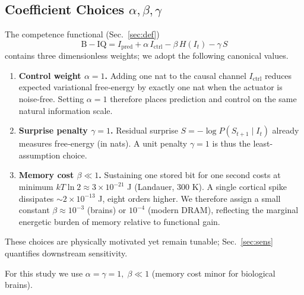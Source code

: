 \documentclass[10pt,conference]{IEEEtran}
\begin{document}
\subsection{Coefficient Choices \texorpdfstring{$\alpha,\beta,\gamma$}{(alpha,beta,gamma)}}
\label{sec:coeff}
The competence functional (Sec.~\ref{sec:def})
\[
\mathrm{B\!-\!IQ}
 = I_{\mathrm{pred}}
 + \alpha\,I_{\mathrm{ctrl}}
 - \beta\,H(I_t)
 - \gamma\,S
\]
contains three dimensionless weights; we adopt the following canonical values.

\begin{enumerate}
\item \textbf{Control weight $\alpha=1$.}  
Adding one nat to the causal channel $I_{\mathrm{ctrl}}$ reduces expected variational free‐energy by exactly one nat when the actuator is noise-free.  Setting $\alpha=1$ therefore places prediction and control on the same natural information scale.

\item \textbf{Surprise penalty $\gamma=1$.}  
Residual surprise $S=-\log P(S_{t+1}\mid I_t)$ already measures free‐energy (in nats).  A unit penalty $\gamma=1$ is thus the least-assumption choice.

\item \textbf{Memory cost $\beta\!\ll\!1$.}  
Sustaining one stored bit for one second costs at minimum $kT\ln2\approx3\times10^{-21}$ J (Landauer, 300 K).  A single cortical spike dissipates $\sim2\times10^{-13}$ J, eight orders higher.  We therefore assign a small constant $\beta\!\approx\!10^{-3}$ (brains) or $10^{-4}$ (modern DRAM), reflecting the marginal energetic burden of memory relative to functional gain.
\end{enumerate}

These choices are physically motivated yet remain tunable; Sec.~\ref{sec:sens} quantifies downstream sensitivity.

For this study we use \(\alpha=\gamma=1,\;\beta\!\ll1\) (memory cost minor for biological brains).

\end{document}
